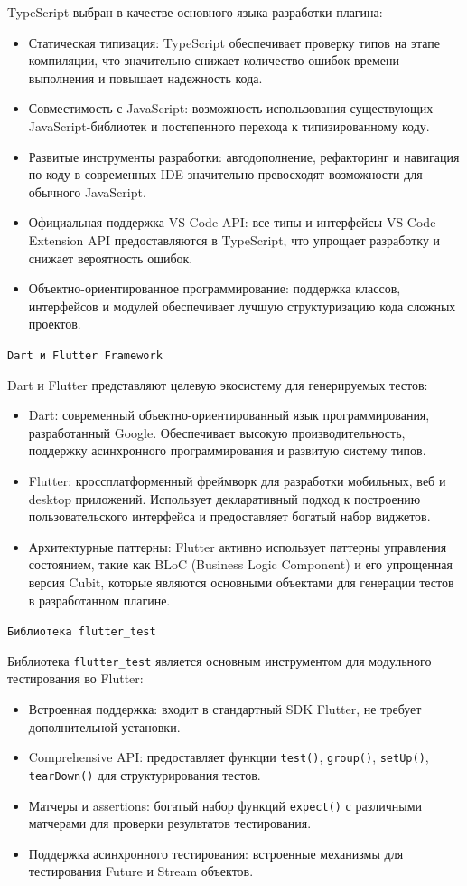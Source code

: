 \documentclass[14pt, russian]{scrartcl}
\begin{document}
TypeScript выбран в качестве основного языка разработки плагина:
\begin{itemize}
    \item Статическая типизация: TypeScript обеспечивает проверку типов на этапе компиляции, что значительно снижает количество ошибок времени выполнения и повышает надежность кода.
    \item Совместимость с JavaScript: возможность использования существующих JavaScript-библиотек и постепенного перехода к типизированному коду.
    \item Развитые инструменты разработки: автодополнение, рефакторинг и навигация по коду в современных IDE значительно превосходят возможности для обычного JavaScript.
    \item Официальная поддержка VS Code API: все типы и интерфейсы VS Code Extension API предоставляются в TypeScript, что упрощает разработку и снижает вероятность ошибок.
    \item Объектно-ориентированное программирование: поддержка классов, интерфейсов и модулей обеспечивает лучшую структуризацию кода сложных проектов.
\end{itemize}

\texttt{Dart и Flutter Framework}

Dart и Flutter представляют целевую экосистему для генерируемых тестов:
\begin{itemize}
    \item Dart: современный объектно-ориентированный язык программирования, разработанный Google. Обеспечивает высокую производительность, поддержку асинхронного программирования и развитую систему типов.
    \item Flutter: кроссплатформенный фреймворк для разработки мобильных, веб и desktop приложений. Использует декларативный подход к построению пользовательского интерфейса и предоставляет богатый набор виджетов.
    \item Архитектурные паттерны: Flutter активно использует паттерны управления состоянием, такие как BLoC (Business Logic Component) и его упрощенная версия Cubit, которые являются основными объектами для генерации тестов в разработанном плагине.
\end{itemize}

\texttt{Библиотека flutter\_test}

Библиотека \texttt{flutter\_test} является основным инструментом для модульного тестирования во Flutter:
\begin{itemize}
    \item Встроенная поддержка: входит в стандартный SDK Flutter, не требует дополнительной установки.
    \item Comprehensive API: предоставляет функции \texttt{test()}, \texttt{group()}, \texttt{setUp()}, \texttt{tearDown()} для структурирования тестов.
    \item Матчеры и assertions: богатый набор функций \texttt{expect()} с различными матчерами для проверки результатов тестирования.
    \item Поддержка асинхронного тестирования: встроенные механизмы для тестирования Future и Stream объектов.
\end{itemize}
\end{document}

